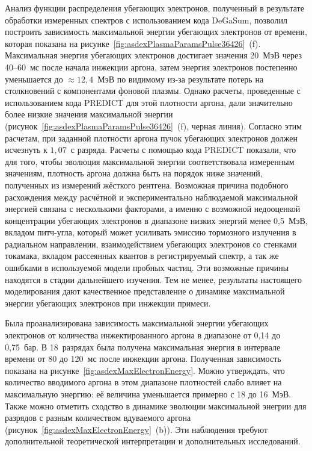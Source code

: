 Анализ функции распределения убегающих электронов, полученный в результате обработки измеренных спектров с использованием кода DeGaSum, позволил построить зависимость максимальной энергии убегающих электронов от времени, которая показана на рисунке~\ref{fig:asdexPlasmaParamsPulse36426}~(f). Максимальная энергия убегающих электронов достигает значения 20~МэВ через 40--60~мс после начала инжекции аргона, затем энергия электронов постепенно уменьшается до $\approx{12,4}$~МэВ по видимому из-за результате потерь на столкновений с компонентами фоновой плазмы. Однако расчеты, проведенные с использованием кода PREDICT для этой плотности аргона, дали значительно более низкие значения максимальной энергии (рисунок~\ref{fig:asdexPlasmaParamsPulse36426}~(f), черная линия). Согласно этим расчетам, при заданной плотности аргона пучок убегающих электронов должен исчезнуть к $1,07$~с разряда. Расчеты с помощью кода PREDICT показали, что для того, чтобы эволюция максимальной энергии соответствовала измеренным значениям, плотность аргона должна быть на порядок ниже значений, полученных из измерений жёсткого рентгена. Возможная причина подобного расхождения между расчётной и экспериментально наблюдаемой максимальной энергией связана с несколькими факторами, а именно с возможной недооценкой концентрации убегающих электронов в диапазоне низких энергий менее 0,5~МэВ, вкладом питч-угла, который может усиливать эмиссию тормозного излучения в радиальном направлении, взаимодействием убегающих электронов со стенками токамака, вкладом рассеянных квантов в регистрируемый спектр, а так же ошибками в используемой модели пробных частиц. Эти возможные причины находятся в стадии дальнейшего изучения. Тем не менее, результаты настоящего моделирования дают качественное представление о динамике максимальной энергии убегающих электронов при инжекции примеси.~\cite{Shevelev2021}

Была проанализирована зависимость максимальной энергии убегающих электронов от количества инжектированного аргона в диапазоне от 0,14 до 0,75~бар. В 18~разрядах была получена максимальная энергия в интервале времени от 80 до 120~мс после инжекции аргона. Полученная зависимость показана на рисунке~\ref{fig:asdexMaxElectronEnergy}. Можно утверждать, что количество вводимого аргона в этом диапазоне плотностей слабо влияет на максимальную энергию: её величина уменьшается примерно с 18 до 16~МэВ. Также можно отметить сходство в динамике эволюции максимальной энегрии для разрядов с разным количеством вдуваемого аргона (рисунок~\ref{fig:asdexMaxElectronEnergy}~(b)). Эти наблюдения требуют дополнительной теоретической интерпретации и дополнительных исследований.~\cite{Shevelev2021}

